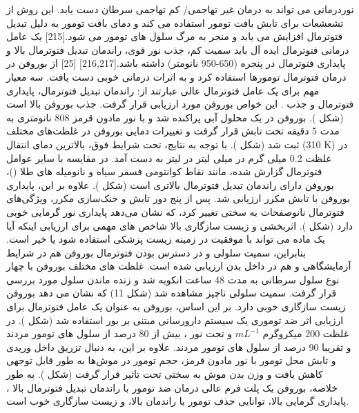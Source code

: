 نوردرمانی می تواند به درمان غیر تهاجمی/ کم تهاجمی سرطان دست یابد. این روش از تشعشعات  برای تابش بافت تومور استفاده می کند و دمای بافت تومور به دلیل تبدیل فتوترمال افزایش می یابد و منجر به مرگ سلول های تومور می شود.\cite{prasadMechanismCellDeath2007}[215] یک عامل درمانی فتوترمال ایده آل باید سمیت کم، جذب نور قوی، راندمان تبدیل فتوترمال بالا و پایداری فتوترمال در پنجره  (650-950 نانومتر) داشته باشد.\cite{jangGoldNanorodPhotosensitizerComplex2011, chengPEGylatedWS2Nanosheets2014}[216,217] \cite{jiNovelTopDownSynthesis2018}[25] از بوروفن در درمان فتوترمال تومورها استفاده کرد و به اثرات درمانی خوبی دست یافت. سه معیار مهم برای یک عامل فتوترمال عالی عبارتند از: راندمان تبدیل فتوترمال، پایداری فتوترمال و جذب . این خواص بوروفن مورد ارزیابی قرار گرفت. جذب  بوروفن بالا است (شکل ). بوروفن در یک محلول آبی پراکنده شد و با نور مادون قرمز 808 نانومتری  به مدت 5 دقیقه تحت تابش قرار گرفت و تغییرات دمایی بوروفن در غلظت‌های مختلف ثبت شد (شکل ). با توجه به نتایج، تحت شرایط فوق، بالاترین دمای انتقال (310 K) در غلظت 0.2 میلی گرم در میلی لیتر در لیتر به دست آمد. در مقایسه با سایر عوامل فتوترمال گزارش شده، مانند نقاط کوانتومی فسفر سیاه  و نانومیله های طلا ()، بوروفن دارای راندمان تبدیل فتوترمال بالاتری  است (شکل ). علاوه بر این، پایداری بوروفن با تابش مکرر  ارزیابی شد. پس از پنج دور تابش و خنک‌سازی مکرر، ویژگی‌های فتوترمال نانوصفحات به سختی تغییر کرد، که نشان می‌دهد پایداری نور گرمایی خوبی دارد (شکل ). اثربخشی و زیست سازگاری بالا شاخص های مهمی برای ارزیابی اینکه آیا یک ماده می تواند با موفقیت در زمینه زیست پزشکی استفاده شود یا خیر است. بنابراین، سمیت سلولی و در دسترس بودن فتوترمال بوروفن هم در شرایط آزمایشگاهی و هم در داخل بدن ارزیابی شده است. غلظت های مختلف بوروفن با چهار نوع سلول سرطانی به مدت 48 ساعت انکوبه شد و زنده ماندن سلول مورد بررسی قرار گرفت. سمیت سلولی ناچیز مشاهده شد (شکل 11) که نشان می دهد بوروفن زیست سازگاری خوبی دارد. بر این اساس، بوروفن به عنوان یک عامل فتوترمال برای ارزیابی اثر ضد توموری یک سیستم دارورسانی مبتنی بر بور استفاده شد (شکل ). در غلظت  200 میکروگرم $mL^{-1}$ و تحت نور ، بیش از 80 درصد از سلول های تومور  مردند و تقریبا 90 درصد از سلول های تومور  مردند. علاوه بر این، به دنبال تزریق داخل وریدی  و تابش محل تومور با نور مادون قرمز، حجم تومور در موش‌ها به طور قابل توجهی کاهش یافت و وزن بدن موش به سختی تحت تاثیر قرار گرفت (شکل ). به طور خلاصه، بوروفن یک پلت فرم عالی درمان ضد تومور با راندمان تبدیل فتوترمال بالا ، پایداری گرمایی بالا، توانایی حذف تومور با راندمان بالا، و زیست سازگاری خوب است.
